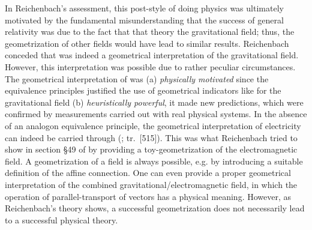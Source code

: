 \documentclass[draft]{article}
\renewcommand{\rzlp}[2]{(\cite[#1]{Reichenbach1928}; tr.\ #2)\xspace}
\renewcommand{\rzlap}[2]{(\cite[#1]{Reichenbach1928}; tr.\ [#2])\xspace}
\begin{document}


In Reichenbach's assessment, this post-\grc style of doing physics was ultimately motivated by the fundamental misunderstanding that the success of general relativity was due to the fact that that theory  the gravitational field; thus, the geometrization of other fields would have lead to similar results. Reichenbach conceded that \gr was indeed a geometrical interpretation of the gravitational field. However, this interpretation was possible due to rather peculiar circumstances. The geometrical interpretation of \rt was (a) \emph{physically motivated} since the equivalence principles justified the use of geometrical indicators like \rac for the gravitational field (b) \emph{heuristically powerful}, it made new predictions, which were confirmed by measurements carried out with real physical systems. In the absence of an analogon equivalence principle, the geometrical interpretation of electricity can indeed be carried through \rzlap{369}{515}. This was what Reichenbach tried to show in section \S49 of \Ap by providing a toy-geometrization of the electromagnetic field. A geometrization of a field is always possible, e.g. by introducing a suitable definition of the affine connection. One can even provide a proper geometrical interpretation of the combined gravitational/electromagnetic field, in which the operation of parallel-transport of vectors has a physical meaning. However, as Reichenbach's theory shows, a successful geometrization does not necessarily lead to a successful physical theory. 
\end{document}
